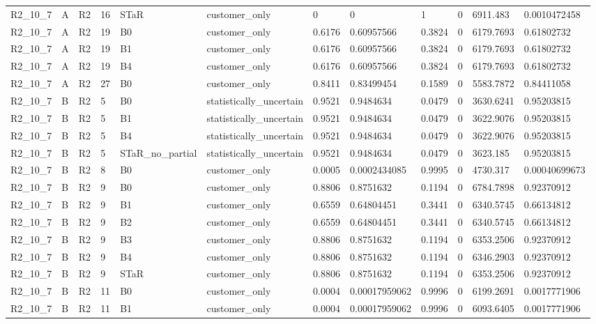 \begin{longtable}{llllllllllll}
R2\_10\_7 & A & R2 & 16 & STaR & customer\_only & 0 & 0 & 1 & 0 & 6911.483 & 0.0010472458 \\
R2\_10\_7 & A & R2 & 19 & B0 & customer\_only & 0.6176 & 0.60957566 & 0.3824 & 0 & 6179.7693 & 0.61802732 \\
R2\_10\_7 & A & R2 & 19 & B1 & customer\_only & 0.6176 & 0.60957566 & 0.3824 & 0 & 6179.7693 & 0.61802732 \\
R2\_10\_7 & A & R2 & 19 & B4 & customer\_only & 0.6176 & 0.60957566 & 0.3824 & 0 & 6179.7693 & 0.61802732 \\
R2\_10\_7 & A & R2 & 27 & B0 & customer\_only & 0.8411 & 0.83499454 & 0.1589 & 0 & 5583.7872 & 0.84411058 \\
R2\_10\_7 & B & R2 & 5 & B0 & statistically\_uncertain & 0.9521 & 0.9484634 & 0.0479 & 0 & 3630.6241 & 0.95203815 \\
R2\_10\_7 & B & R2 & 5 & B1 & statistically\_uncertain & 0.9521 & 0.9484634 & 0.0479 & 0 & 3622.9076 & 0.95203815 \\
R2\_10\_7 & B & R2 & 5 & B4 & statistically\_uncertain & 0.9521 & 0.9484634 & 0.0479 & 0 & 3622.9076 & 0.95203815 \\
R2\_10\_7 & B & R2 & 5 & STaR\_no\_partial & statistically\_uncertain & 0.9521 & 0.9484634 & 0.0479 & 0 & 3623.185 & 0.95203815 \\
R2\_10\_7 & B & R2 & 8 & B0 & customer\_only & 0.0005 & 0.0002434085 & 0.9995 & 0 & 4730.317 & 0.00040699673 \\
R2\_10\_7 & B & R2 & 9 & B0 & customer\_only & 0.8806 & 0.8751632 & 0.1194 & 0 & 6784.7898 & 0.92370912 \\
R2\_10\_7 & B & R2 & 9 & B1 & customer\_only & 0.6559 & 0.64804451 & 0.3441 & 0 & 6340.5745 & 0.66134812 \\
R2\_10\_7 & B & R2 & 9 & B2 & customer\_only & 0.6559 & 0.64804451 & 0.3441 & 0 & 6340.5745 & 0.66134812 \\
R2\_10\_7 & B & R2 & 9 & B3 & customer\_only & 0.8806 & 0.8751632 & 0.1194 & 0 & 6353.2506 & 0.92370912 \\
R2\_10\_7 & B & R2 & 9 & B4 & customer\_only & 0.8806 & 0.8751632 & 0.1194 & 0 & 6346.2903 & 0.92370912 \\
R2\_10\_7 & B & R2 & 9 & STaR & customer\_only & 0.8806 & 0.8751632 & 0.1194 & 0 & 6353.2506 & 0.92370912 \\
R2\_10\_7 & B & R2 & 11 & B0 & customer\_only & 0.0004 & 0.00017959062 & 0.9996 & 0 & 6199.2691 & 0.0017771906 \\
R2\_10\_7 & B & R2 & 11 & B1 & customer\_only & 0.0004 & 0.00017959062 & 0.9996 & 0 & 6093.6405 & 0.0017771906 \\

\end{longtable}
